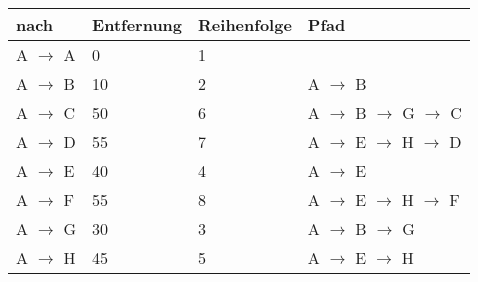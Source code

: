 \documentclass{bschlangaul-aufgabe}
\begin{document}
\begin{enumerate}
\begin{bAntwort}
\begin{tabular}{llll}
\bf{nach}                                         & \bf{Entfernung}                                   & \bf{Reihenfolge}                                  & \bf{Pfad}                                         \\
\hline
A  $\rightarrow$  A                               & 0                                                 & 1                                                 &                                                   \\
A  $\rightarrow$  B                               & 10                                                & 2                                                 & A $\rightarrow$ B                                 \\
A  $\rightarrow$  C                               & 50                                                & 6                                                 & A $\rightarrow$ B $\rightarrow$ G $\rightarrow$ C \\
A  $\rightarrow$  D                               & 55                                                & 7                                                 & A $\rightarrow$ E $\rightarrow$ H $\rightarrow$ D \\
A  $\rightarrow$  E                               & 40                                                & 4                                                 & A $\rightarrow$ E                                 \\
A  $\rightarrow$  F                               & 55                                                & 8                                                 & A $\rightarrow$ E $\rightarrow$ H $\rightarrow$ F \\
A  $\rightarrow$  G                               & 30                                                & 3                                                 & A $\rightarrow$ B $\rightarrow$ G                 \\
A  $\rightarrow$  H                               & 45                                                & 5                                                 & A $\rightarrow$ E $\rightarrow$ H                 \\
\end{tabular}
\end{bAntwort}
\end{enumerate}
\end{document}
